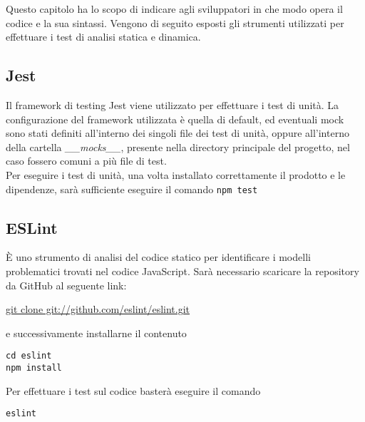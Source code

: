 \documentclass[../manuale_sviluppatore.tex]{subfiles}
\begin{document}
Questo capitolo ha lo scopo di indicare agli sviluppatori in che modo opera il codice e la sua sintassi. 
Vengono di seguito esposti gli strumenti utilizzati per effettuare i test di analisi statica e dinamica.

\subsection{Jest}
Il framework di testing Jest viene utilizzato per effettuare i test di unità. La configurazione del 
framework utilizzata è quella di default, ed eventuali mock sono stati definiti all'interno dei singoli 
file dei test di unità, oppure all'interno della cartella \emph{\_\_mocks\_\_}, presente nella 
directory principale del progetto, nel caso fossero comuni a più file di test.\\

Per eseguire i test di unità, una volta installato correttamente il prodotto e le dipendenze, sarà 
sufficiente eseguire il comando \verb|npm test|

\subsection{ESLint}
È uno strumento di analisi del codice statico per identificare i modelli problematici trovati nel codice JavaScript.
Sarà necessario scaricare la repository da GitHub al seguente link: 
\begin{center} \url{git clone git://github.com/eslint/eslint.git} \end{center}
e successivamente installarne il contenuto
\begin{center}
    \verb|cd eslint| \\
    \verb|npm install|
\end{center}

Per effettuare i test sul codice basterà eseguire il comando
\begin{center} \verb|eslint| \end{center}
\end{document}
